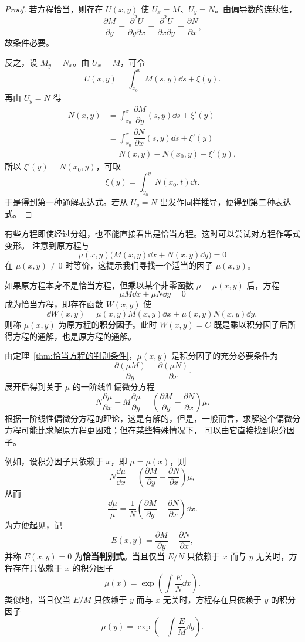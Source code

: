\begin{proof}
若方程恰当，则存在 $U(x,y)$ 使 $U_x=M$、$U_y=N$。由偏导数的连续性，
\[
	\dfrac{\partial M}{\partial y}
	=\dfrac{\partial^2U}{\partial y\partial x}
	=\dfrac{\partial^2U}{\partial x\partial y}
	=\dfrac{\partial N}{\partial x},
\]
故条件必要。

反之，设 $M_y=N_x$。由 $U_x=M$，可令
\[
	U(x,y)=\int_{x_0}^{x}M(s,y)\dd s+\xi(y).
\]
再由 $U_y=N$ 得
\[
	\begin{aligned}
	N(x,y)
	&=\int_{x_0}^{x}\dfrac{\partial M}{\partial y}(s,y)\dd s+\xi'(y)\\
	&=\int_{x_0}^{x}\dfrac{\partial N}{\partial x}(s,y)\dd s+\xi'(y)\\
	&=N(x,y)-N(x_0,y)+\xi'(y),
	\end{aligned}
\]
所以 $\xi'(y)=N(x_0,y)$，可取
\[
	\xi(y)=\int_{y_0}^{y}N(x_0,t)\dd t.
\]
于是得到第一种通解表达式。若从 $U_y=N$ 出发作同样推导，便得到第二种表达式。
\end{proof}

有些方程即使经过分组，也不能直接看出是恰当方程。这时可以尝试对方程作等式变形。
注意到原方程与
\[
	\mu(x,y)\bigl(M(x,y)\dd x+N(x,y)\dd y\bigr)=0
\]
在 $\mu(x,y)\neq 0$ 时等价，这提示我们寻找一个适当的因子 $\mu(x,y)$。

\begin{definition}\label{def:积分因子}
	如果原方程本身不是恰当方程，但乘以某个非零函数 $\mu=\mu(x,y)$ 后，方程
\[
	\mu M\dd x+\mu N\dd y=0
\]
成为恰当方程，即存在函数 $W(x,y)$ 使
\[
	\dd W(x,y)=\mu(x,y)M(x,y)\dd x+\mu(x,y)N(x,y)\dd y,
\]
则称 $\mu(x,y)$ 为原方程的\textbf{积分因子}。此时 $W(x,y)=C$
既是乘以积分因子后所得方程的通解，也是原方程的通解。
\end{definition}

由定理~\ref{thm:恰当方程的判别条件}，$\mu(x,y)$ 是积分因子的充分必要条件为
\[
	\dfrac{\partial(\mu M)}{\partial y}
	=\dfrac{\partial(\mu N)}{\partial x}.
\]
展开后得到关于 $\mu$ 的一阶线性偏微分方程
\[
	N\dfrac{\partial\mu}{\partial x}
	-M\dfrac{\partial\mu}{\partial y}
	=\left(\dfrac{\partial M}{\partial y}
	-\dfrac{\partial N}{\partial x}\right)\mu.
\]
根据一阶线性偏微分方程的理论，这是有解的，但是，一般而言，求解这个偏微分方程可能比求解原方程更困难；但在某些特殊情况下，
可以由它直接找到积分因子。

例如，设积分因子只依赖于 $x$，即 $\mu=\mu(x)$，则
\[
	N\dfrac{\dd\mu}{\dd x}
	=\left(\dfrac{\partial M}{\partial y}
	-\dfrac{\partial N}{\partial x}\right)\mu,
\]
从而
\[
	\dfrac{\dd\mu}{\mu}
	=\dfrac{1}{N}\left(
	\dfrac{\partial M}{\partial y}-\dfrac{\partial N}{\partial x}
	\right)\dd x.
\]
为方便起见，记
\[
	E(x,y)=\dfrac{\partial M}{\partial y}
	-\dfrac{\partial N}{\partial x},
\]
并称 $E(x,y)=0$ 为\textbf{恰当判别式}。当且仅当 $E/N$ 只依赖于 $x$
而与 $y$ 无关时，方程存在只依赖于 $x$ 的积分因子
\[
	\mu(x)=\exp\left(\int\dfrac{E}{N}\dd x\right).
\]
类似地，当且仅当 $E/M$ 只依赖于 $y$ 而与 $x$ 无关时，方程存在只依赖于 $y$ 的积分因子
\[
	\mu(y)=\exp\left(-\int\dfrac{E}{M}\dd y\right).
\]

